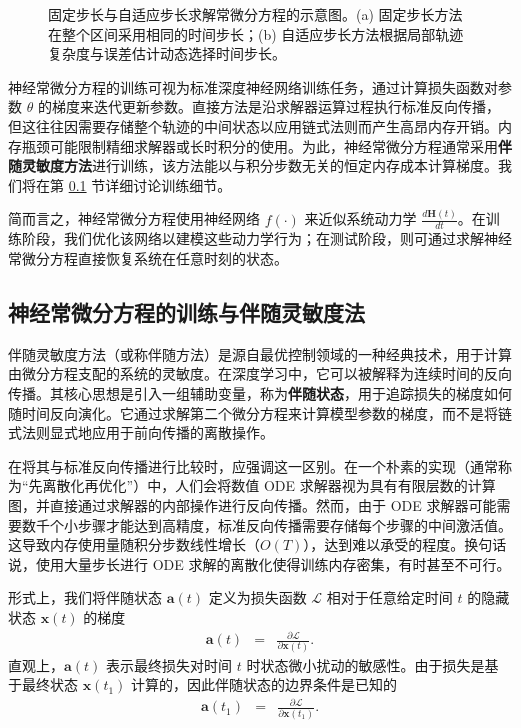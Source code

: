 \documentclass[UTF8,a4paper,zihao=-4,oneside,openany]{ctexbook}
\makeatletter
\newcommand{\AMLFigure}[2][0.96\linewidth]{%
  \begingroup
  \let\AtBeginDocument\@gobble
  \endgroup
}
\makeatother
\begin{document}
\begin{figure}[!t]
\centering
\AMLFigure{figure-fixed-step-size-vs-adaptive-step-size}
\caption{固定步长与自适应步长求解常微分方程的示意图。(a) 固定步长方法在整个区间采用相同的时间步长；(b) 自适应步长方法根据局部轨迹复杂度与误差估计动态选择时间步长。}
\label{fig:fixed-step-size-vs-adaptive-step-size}
\end{figure}

神经常微分方程的训练可视为标准深度神经网络训练任务，通过计算损失函数对参数 $\theta$ 的梯度来迭代更新参数。直接方法是沿求解器运算过程执行标准反向传播，但这往往因需要存储整个轨迹的中间状态以应用链式法则而产生高昂内存开销。内存瓶颈可能限制精细求解器或长时积分的使用。为此，神经常微分方程通常采用\textbf{伴随灵敏度方法}进行训练，该方法能以与积分步数无关的恒定内存成本计算梯度。我们将在第 \ref{sec:neuralode-training} 节详细讨论训练细节。

简而言之，神经常微分方程使用神经网络 $f(\cdot)$ 来近似系统动力学 $\frac{d \mathbf{H}(t)}{d t}$。在训练阶段，我们优化该网络以建模这些动力学行为；在测试阶段，则可通过求解神经常微分方程直接恢复系统在任意时刻的状态。

\subsection{神经常微分方程的训练与伴随灵敏度法}
\label{sec:neuralode-training}
伴随灵敏度方法（或称伴随方法）是源自最优控制领域的一种经典技术，用于计算由微分方程支配的系统的灵敏度。在深度学习中，它可以被解释为连续时间的反向传播。其核心思想是引入一组辅助变量，称为\textbf{伴随状态}，用于追踪损失的梯度如何随时间反向演化。它通过求解第二个微分方程来计算模型参数的梯度，而不是将链式法则显式地应用于前向传播的离散操作。

在将其与标准反向传播进行比较时，应强调这一区别。在一个朴素的实现（通常称为“先离散化再优化”）中，人们会将数值 ODE 求解器视为具有有限层数的计算图，并直接通过求解器的内部操作进行反向传播。然而，由于 ODE 求解器可能需要数千个小步骤才能达到高精度，标准反向传播需要存储每个步骤的中间激活值。这导致内存使用量随积分步数线性增长（$O(T)$），达到难以承受的程度。换句话说，使用大量步长进行 ODE 求解的离散化使得训练内存密集，有时甚至不可行。

形式上，我们将伴随状态 $\mathbf{a}(t)$ 定义为损失函数 $\mathcal{L}$ 相对于任意给定时间 $t$ 的隐藏状态 $\mathbf{x}(t)$ 的梯度
\begin{eqnarray}
\mathbf{a}(t) & = & \frac{\partial \mathcal{L}}{\partial \mathbf{x}(t)}.
\end{eqnarray}
直观上，$\mathbf{a}(t)$ 表示最终损失对时间 $t$ 时状态微小扰动的敏感性。由于损失是基于最终状态 $\mathbf{x}(t_1)$ 计算的，因此伴随状态的边界条件是已知的
\begin{eqnarray}
\mathbf{a}(t_1) & = & \frac{\partial \mathcal{L}}{\partial \mathbf{x}(t_1)}.
\end{eqnarray}
\end{document}
